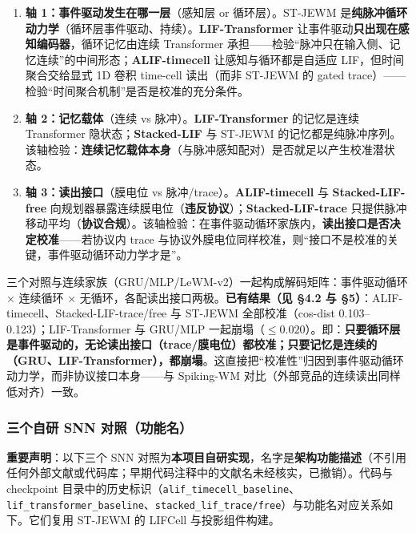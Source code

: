 \documentclass[11pt,a4paper]{article}
\begin{document}
\begin{enumerate}[leftmargin=2em]
    \item \textbf{轴 1：事件驱动发生在哪一层}（感知层 or 循环层）。ST-JEWM 是\textbf{纯脉冲循环动力学}（循环层事件驱动、持续）。\textbf{LIF-Transformer} 让事件驱动\textbf{只出现在感知编码器}，循环记忆由连续 Transformer 承担——检验“脉冲只在输入侧、记忆连续”的中间形态；\textbf{ALIF-timecell} 让感知与循环都是自适应 LIF，但时间聚合交给显式 1D 卷积 time-cell 读出（而非 ST-JEWM 的 gated trace）——检验“时间聚合机制”是否是校准的充分条件。
    \item \textbf{轴 2：记忆载体}（连续 vs 脉冲）。\textbf{LIF-Transformer} 的记忆是连续 Transformer 隐状态；\textbf{Stacked-LIF} 与 ST-JEWM 的记忆都是纯脉冲序列。该轴检验：\textbf{连续记忆载体本身}（与脉冲感知配对）是否就足以产生校准潜状态。
    \item \textbf{轴 3：读出接口}（膜电位 vs 脉冲/trace）。\textbf{ALIF-timecell} 与 \textbf{Stacked-LIF-free} 向规划器暴露连续膜电位（\textbf{违反协议}）；\textbf{Stacked-LIF-trace} 只提供脉冲移动平均（\textbf{协议合规}）。该轴检验：在事件驱动循环家族内，\textbf{读出接口是否决定校准}——若协议内 trace 与协议外膜电位同样校准，则“接口不是校准的关键，事件驱动循环动力学才是”。
\end{enumerate}

三个对照与连续家族（GRU/MLP/LeWM-v2）一起构成解码矩阵：事件驱动循环 × 连续循环 × 无循环，各配读出接口两极。\textbf{已有结果（见 §4.2 与 §5）}：ALIF-timecell、Stacked-LIF-trace/free 与 ST-JEWM 全部校准（cos-dist 0.103--0.123）；LIF-Transformer 与 GRU/MLP 一起崩塌（$\leq 0.020$）。即：\textbf{只要循环层是事件驱动的，无论读出接口（trace/膜电位）都校准；只要记忆是连续的（GRU、LIF-Transformer），都崩塌}。这直接把“校准性”归因到事件驱动循环动力学，而非协议接口本身——与 Spiking-WM 对比（外部竞品的连续读出同样低对齐）一致。

\subsubsection{三个自研 SNN 对照（功能名）}

\textbf{重要声明}：以下三个 SNN 对照为\textbf{本项目自研实现}，名字是\textbf{架构功能描述}（不引用任何外部文献或代码库；早期代码注释中的文献名未经核实，已撤销）。代码与 checkpoint 目录中的历史标识（\texttt{alif\_timecell\_baseline}、\texttt{lif\_transformer\_baseline}、\texttt{stacked\_lif\_trace/free}）与功能名对应关系如下。它们复用 ST-JEWM 的 LIFCell 与投影组件构建。
\end{document}
